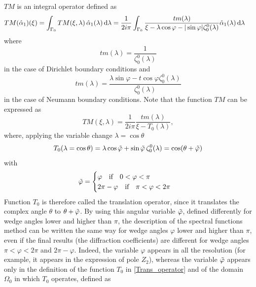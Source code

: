 $TM$ is an integral operator defined as
\begin{equation}
\label{TM_operator}
\begin{split}
TM(\hat{\alpha}_1)(\xi) &= \int_{\Gamma_0} TM(\xi,\lambda) \, \hat{\alpha}_1(\lambda) \, {\rm d} \lambda =\dfrac{1}{2i\pi} \int_{\Gamma_0} \dfrac{ tm(\lambda)}{ \xi- \lambda \cos \varphi  - |\sin \varphi| \zeta_0^0(\lambda)} \hat{\alpha}_1(\lambda) \, {\rm d} \lambda 
\end{split}
\end{equation}
where 
\begin{equation}
\label{tmDir}
tm(\lambda)=\dfrac{1}{\zeta_0^0(\lambda)}
\end{equation}
in the case of Dirichlet boundary conditions and 
\begin{equation}
\label{tmNeu}
tm(\lambda)=\dfrac{\lambda\sin\varphi-t\cos\varphi\zeta_0^0(\lambda)}{\zeta_0^0(\lambda)}
\end{equation}
in the case of Neumann boundary conditions.
Note that the function $TM$ can be expressed as
\begin{equation}
TM(\xi,\lambda) =  \dfrac{1}{2i\pi} \dfrac{ tm(\lambda)}{ \xi- T_0(\lambda)} , 
\end{equation}
where, applying the variable change $\lambda=\cos\theta$
\begin{equation}
\label{Trans_operator}
T_0(\lambda=\cos\theta) =  \lambda \cos \tilde{\varphi}  + \sin \tilde{\varphi} \, \zeta_0^0(\lambda) =  \cos (\theta + \tilde{\varphi})
\end{equation}
with 
\begin{equation}
\tilde{\varphi} =
\begin{cases}
 \varphi \quad \text{if} \quad 0 < \varphi < \pi \qquad \\
 2\pi - \varphi \quad \text{if} \quad \pi < \varphi < 2\pi
 \label{phitilde}
\end{cases}
\end{equation}
Function $T_0$ is therefore called the translation operator, since it translates the complex angle $\theta$ to $\theta+\tilde{\varphi}$. By using this angular variable $\tilde{\varphi}$, defined differently for wedge angles lower and higher than $\pi$, the description of the spectral functions method can be written the same way for wedge angles $\varphi$ lower and higher than $\pi$, even if the final results (the diffraction coefficients) are different for wedge angles $\pi<\varphi<2\pi$ and $2\pi-\varphi$. Indeed, the variable $\varphi$ appears in all the resolution (for example, it appears in the expression of pole $Z_2$), whereas the variable $\tilde{\varphi}$ appears only in the definition of the function $T_0$ in \eqref{Trans_operator} and of the domain $\Omega_0$ in which $T_0$ operates, defined as
